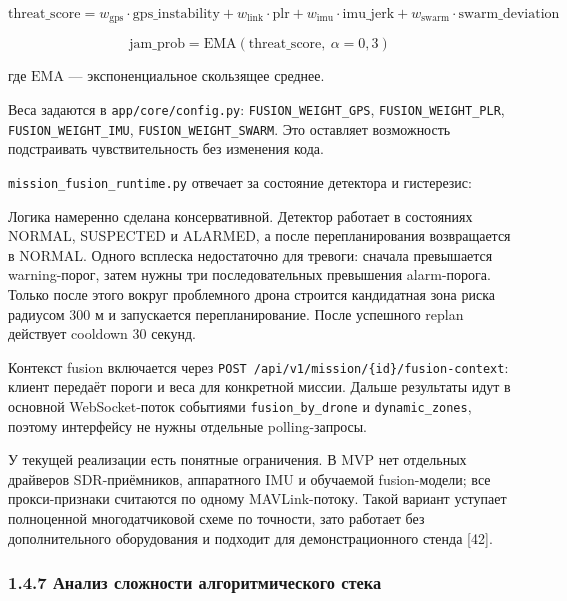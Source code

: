 \documentclass[14pt,a4paper]{extarticle}
\begin{document}
\[\mathrm{threat\_score} = w_{\mathrm{gps}} \cdot \mathrm{gps\_instability} + w_{\mathrm{link}} \cdot \mathrm{plr} + w_{\mathrm{imu}} \cdot \mathrm{imu\_jerk} + w_{\mathrm{swarm}} \cdot \mathrm{swarm\_deviation}\]

\[\mathrm{jam\_prob} = \mathrm{EMA}(\mathrm{threat\_score},\ \alpha = 0{,}3)\]

где \(\mathrm{EMA}\) --- экспоненциальное скользящее среднее.

Веса задаются в \texttt{app/core/config.py}: \texttt{FUSION\_WEIGHT\_GPS}, \texttt{FUSION\_WEIGHT\_PLR}, \texttt{FUSION\_WEIGHT\_IMU}, \texttt{FUSION\_WEIGHT\_SWARM}. Это оставляет возможность подстраивать чувствительность без изменения кода.

\texttt{mission\_fusion\_runtime.py} отвечает за состояние детектора и гистерезис:

Логика намеренно сделана консервативной. Детектор работает в состояниях NORMAL, SUSPECTED и ALARMED, а после перепланирования возвращается в NORMAL. Одного всплеска недостаточно для тревоги: сначала превышается warning-порог, затем нужны три последовательных превышения alarm-порога. Только после этого вокруг проблемного дрона строится кандидатная зона риска радиусом 300 м и запускается перепланирование. После успешного replan действует cooldown 30 секунд.


Контекст fusion включается через \texttt{POST\ /api/v1/mission/\{id\}/fusion-context}: клиент передаёт пороги и веса для конкретной миссии. Дальше результаты идут в основной WebSocket-поток событиями \texttt{fusion\_by\_drone} и \texttt{dynamic\_zones}, поэтому интерфейсу не нужны отдельные polling-запросы.

У текущей реализации есть понятные ограничения. В MVP нет отдельных драйверов SDR-приёмников, аппаратного IMU и обучаемой fusion-модели; все прокси-признаки считаются по одному MAVLink-потоку. Такой вариант уступает полноценной многодатчиковой схеме по точности, зато работает без дополнительного оборудования и подходит для демонстрационного стенда {[}42{]}.

\hypertarget{ux430ux43dux430ux43bux438ux437-ux441ux43bux43eux436ux43dux43eux441ux442ux438-ux430ux43bux433ux43eux440ux438ux442ux43cux438ux447ux435ux441ux43aux43eux433ux43e-ux441ux442ux435ux43aux430}{%
\subsubsection{1.4.7 Анализ сложности алгоритмического стека}\label{ux430ux43dux430ux43bux438ux437-ux441ux43bux43eux436ux43dux43eux441ux442ux438-ux430ux43bux433ux43eux440ux438ux442ux43cux438ux447ux435ux441ux43aux43eux433ux43e-ux441ux442ux435ux43aux430}}
\end{document}
